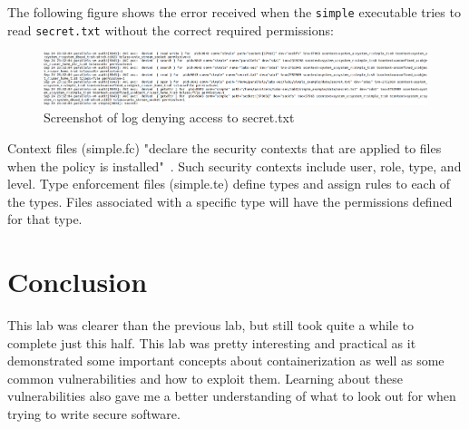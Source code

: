 \documentclass[11pt]{article}
\begin{document}
The following figure shows the error received when the \verb|simple| executable tries to read \verb|secret.txt| without the correct required permissions:
\begin{figure}[htbp]
  \centering
  \includegraphics[width=.9\linewidth]{./log.png}
  \caption{\label{fig:log}
  Screenshot of log denying access to secret.txt}
\end{figure}

Context files (simple.fc) "declare the security contexts that are applied to files when the policy is installed"~\cite{context}.
Such security contexts include user, role, type, and level.
Type enforcement files (simple.te) define types and assign rules to each of the types.
Files associated with a specific type will have the permissions defined for that type.

\section*{Conclusion}
\label{sec:conclusion}
This lab was clearer than the previous lab, but still took quite a while to complete just this half.
This lab was pretty interesting and practical as it demonstrated some important concepts about containerization
as well as some common vulnerabilities and how to exploit them. Learning about these vulnerabilities also gave me a better understanding of
what to look out for when trying to write secure software.

\newpage
\nocite{*}


\end{document}
